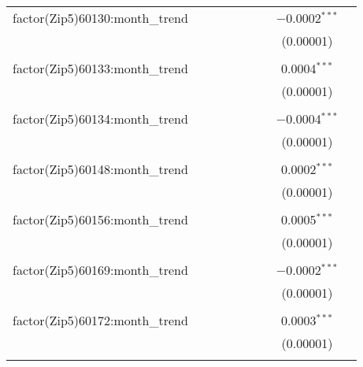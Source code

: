 \begin{table}[H]
{\begin{tabular}{@{\extracolsep{5pt}}lcccccccc}
  factor(Zip5)60130:month\_trend &  &  &  &  &  &  & $-$0.0002$^{***}$ &  \\  

   &  &  &  &  &  &  & (0.00001) &  \\  

   & & & & & & & & \\  

  factor(Zip5)60133:month\_trend &  &  &  &  &  &  & 0.0004$^{***}$ &  \\  

   &  &  &  &  &  &  & (0.00001) &  \\  

   & & & & & & & & \\  

  factor(Zip5)60134:month\_trend &  &  &  &  &  &  & $-$0.0004$^{***}$ &  \\  

   &  &  &  &  &  &  & (0.00001) &  \\  

   & & & & & & & & \\  

  factor(Zip5)60148:month\_trend &  &  &  &  &  &  & 0.0002$^{***}$ &  \\  

   &  &  &  &  &  &  & (0.00001) &  \\  

   & & & & & & & & \\  

  factor(Zip5)60156:month\_trend &  &  &  &  &  &  & 0.0005$^{***}$ &  \\  

   &  &  &  &  &  &  & (0.00001) &  \\  

   & & & & & & & & \\  

  factor(Zip5)60169:month\_trend &  &  &  &  &  &  & $-$0.0002$^{***}$ &  \\  

   &  &  &  &  &  &  & (0.00001) &  \\  

   & & & & & & & & \\  

  factor(Zip5)60172:month\_trend &  &  &  &  &  &  & 0.0003$^{***}$ &  \\  

   &  &  &  &  &  &  & (0.00001) &  \\  

   & & & & & & & & \\  


\end{tabular}}
\end{table}
